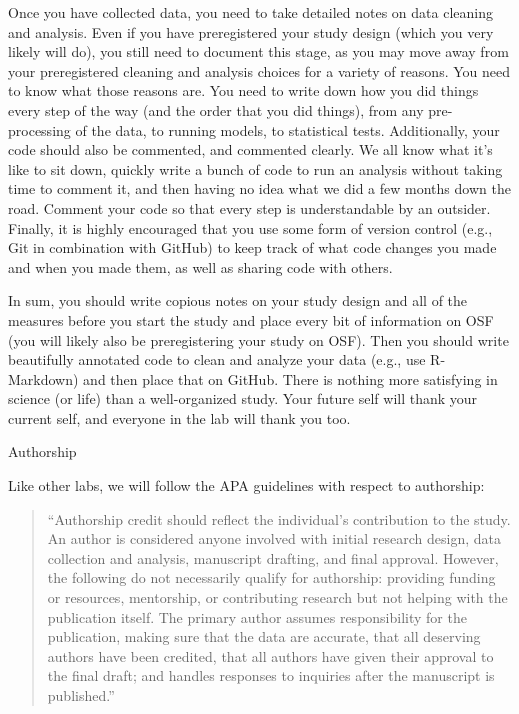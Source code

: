 \documentclass[
]{book}
\begin{document}
Once you have collected data, you need to take detailed notes on data cleaning and analysis. Even if you have preregistered your study design (which you very likely will do), you still need to document this stage, as you may move away from your preregistered cleaning and analysis choices for a variety of reasons. You need to know what those reasons are. You need to write down how you did things every step of the way (and the order that you did things), from any pre-processing of the data, to running models, to statistical tests. Additionally, your code should also be commented, and commented clearly. We all know what it's like to sit down, quickly write a bunch of code to run an analysis without taking time to comment it, and then having no idea what we did a few months down the road. Comment your code so that every step is understandable by an outsider. Finally, it is highly encouraged that you use some form of version control (e.g., Git in combination with GitHub) to keep track of what code changes you made and when you made them, as well as sharing code with others.

In sum, you should write copious notes on your study design and all of the measures before you start the study and place every bit of information on OSF (you will likely also be preregistering your study on OSF). Then you should write beautifully annotated code to clean and analyze your data (e.g., use R-Markdown) and then place that on GitHub. There is nothing more satisfying in science (or life) than a well-organized study. Your future self will thank your current self, and everyone in the lab will thank you too.

Authorship

Like other labs, we will follow the APA guidelines with respect to authorship:

\begin{quote}
``Authorship credit should reflect the individual's contribution to the study. An author is considered anyone involved with initial research design, data collection and analysis, manuscript drafting, and final approval. However, the following do not necessarily qualify for authorship: providing funding or resources, mentorship, or contributing research but not helping with the publication itself. The primary author assumes responsibility for the publication, making sure that the data are accurate, that all deserving authors have been credited, that all authors have given their approval to the final draft; and handles responses to inquiries after the manuscript is published.''
\end{quote}
\end{document}
